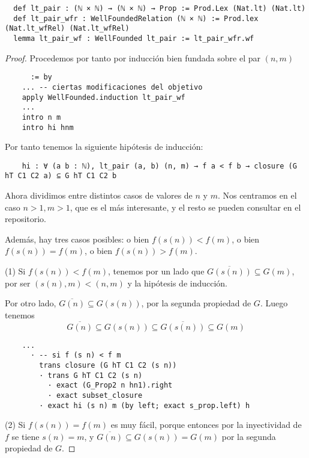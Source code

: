 \begin{lstlisting}
  def lt_pair : (ℕ × ℕ) → (ℕ × ℕ) → Prop := Prod.Lex (Nat.lt) (Nat.lt)
  def lt_pair_wfr : WellFoundedRelation (ℕ × ℕ) := Prod.lex (Nat.lt_wfRel) (Nat.lt_wfRel)
  lemma lt_pair_wf : WellFounded lt_pair := lt_pair_wfr.wf
\end{lstlisting}

\begin{proof}
  Procedemos por tanto por inducción bien fundada sobre el par $(n, m)$

  \begin{lstlisting}
      := by
    ... -- ciertas modificaciones del objetivo
    apply WellFounded.induction lt_pair_wf
    ...
    intro n m
    intro hi hnm \end{lstlisting}

  Por tanto tenemos la siguiente hipótesis de inducción:

  \begin{lstlisting}
    hi : ∀ (a b : ℕ), lt_pair (a, b) (n, m) → f a < f b → closure (G hT C1 C2 a) ⊆ G hT C1 C2 b \end{lstlisting}

  Ahora dividimos entre distintos casos de valores de $n$ y $m$. Nos centramos en el caso $n >1, m>1$, que es el más interesante, y el resto se pueden consultar en el repositorio.

  Además, hay tres casos posibles: o bien $f(s(n)) < f(m)$, o bien $f(s(n)) = f(m)$, o bien $f(s(n)) > f(m)$.

  (1) Si $f(s(n)) < f(m)$, tenemos por un lado que $\overline{G(s(n))} \subseteq G(m)$, por ser $(s(n), m) < (n, m)$ y la hipótesis de inducción.

  Por otro lado, $\overline{G(n)} \subseteq G(s(n))$, por la segunda propiedad de $G$. Luego tenemos
  $$
  \overline{G(n)} \subseteq G(s(n)) \subseteq \overline{G(s(n))} \subseteq G(m)
  $$

  \begin{lstlisting}
    ...
      · -- si f (s n) < f m
        trans closure (G hT C1 C2 (s n))
        · trans G hT C1 C2 (s n)
          · exact (G_Prop2 n hn1).right
          · exact subset_closure
        · exact hi (s n) m (by left; exact s_prop.left) h \end{lstlisting}

  (2) Si $f(s(n)) = f(m)$ es muy fácil, porque entonces por la inyectividad de $f$ se tiene $s(n)= m$, y $\overline{G(n)} \subseteq G(s(n)) = G(m)$ por la segunda propiedad de $G$.


\end{proof}

